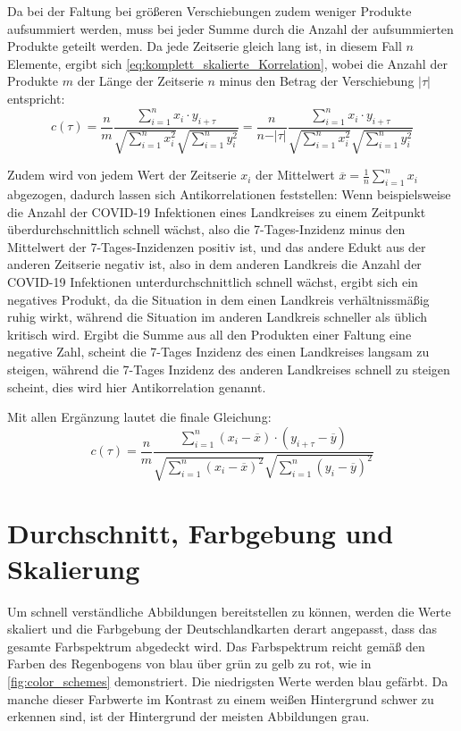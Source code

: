 Da bei der Faltung bei größeren Verschiebungen zudem weniger Produkte aufsummiert werden, muss bei jeder Summe durch die Anzahl der aufsummierten Produkte geteilt werden. Da jede Zeitserie gleich lang ist, in diesem Fall $n$ Elemente, ergibt sich \autoref{eq:komplett_skalierte_Korrelation}, wobei die Anzahl der Produkte $m$ der Länge der Zeitserie $n$ minus den Betrag der Verschiebung $\vert\tau\vert$ entspricht:
\begin{equation}\label{eq:komplett_skalierte_Korrelation}
    c(\tau) =\frac{n}{m} \frac{\sum_{i=1}^n x_i\cdot y_{i+\tau}}{\sqrt{\sum_{i=1}^n x_i^2}\sqrt{\sum_{i=1}^n y_i^2}}=
    \frac{n}{n-\vert\tau\vert} \frac{\sum_{i=1}^n x_i\cdot y_{i+\tau}}{\sqrt{\sum_{i=1}^n x_i^2}\sqrt{\sum_{i=1}^n y_i^2}}
\end{equation}

Zudem wird von jedem Wert der Zeitserie $x_i$ der Mittelwert $\overline x = \frac{1}{n}\sum_{i=1}^n x_i$ abgezogen, dadurch lassen sich Antikorrelationen feststellen: Wenn beispielsweise die Anzahl der COVID-19 Infektionen eines Landkreises zu einem Zeitpunkt überdurchschnittlich schnell wächst, also die 7-Tages-Inzidenz minus den Mittelwert der 7-Tages-Inzidenzen positiv ist, und das andere Edukt aus der anderen Zeitserie negativ ist, also in dem anderen Landkreis die Anzahl der COVID-19 Infektionen unterdurchschnittlich schnell wächst, ergibt sich ein negatives Produkt, da die Situation in dem einen Landkreis verhältnissmäßig ruhig wirkt, während die Situation im anderen Landkreis schneller als üblich kritisch wird. Ergibt die Summe aus all den Produkten einer Faltung eine negative Zahl, scheint die 7-Tages Inzidenz des einen Landkreises langsam zu steigen, während die 7-Tages Inzidenz des anderen Landkreises schnell zu steigen scheint, dies wird hier Antikorrelation genannt.

Mit allen Ergänzung lautet die finale Gleichung:
\begin{equation}\label{eq:Korrelation_Mittelwert}
    c(\tau) =\frac{n}{m}
    \frac{\sum_{i=1}^n (x_i-\overline x)\cdot (y_{i+\tau}-\overline y)}{\sqrt{\sum_{i=1}^n (x_i-\overline x)^2}\sqrt{\sum_{i=1}^n (y_i-\overline y)^2}}
\end{equation}
\section{Durchschnitt, Farbgebung und Skalierung}\label{sec:Durchschnitt, Farbgebung und Skalierung}
Um schnell verständliche Abbildungen bereitstellen zu können, werden die Werte skaliert und die Farbgebung der Deutschlandkarten derart angepasst, dass das gesamte Farbspektrum abgedeckt wird. Das Farbspektrum reicht gemäß den Farben des Regenbogens von blau über grün zu gelb zu rot, wie in \autoref{fig:color_schemes} demonstriert. Die niedrigsten Werte werden blau gefärbt.
Da manche dieser Farbwerte im Kontrast zu einem weißen Hintergrund schwer zu erkennen sind, ist der Hintergrund der meisten Abbildungen grau.

